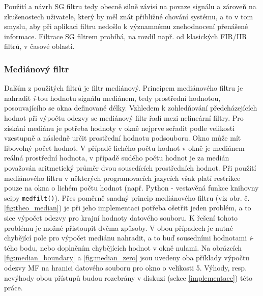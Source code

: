 \documentclass[a4paper, 12pt]{article}
\begin{document}
\noindent Použití a návrh SG filtru tedy obecně silně závisí na povaze signálu a zároveň na zkušenostech uživatele, který by měl znát přibližné chování systému, a to v tom smyslu, aby při aplikaci filtru nedošlo k významnému znehodnocení přenášené informace.
\vskip 0.1in
\noindent Filtrace SG filtrem probíhá, na rozdíl např. od klasických FIR/IIR filtrů, v časové oblasti.

\subsubsection{Mediánový filtr}
\label{sec:filtr3}
Dalším z použitých filtrů je filtr mediánový. Principem mediánového filtru je nahradit \textit{i}-tou hodnotu signálu mediánem, tedy prostřední hodnotou, posouvajícího se okna definované délky. Vzhledem k zohledňování předcházejících hodnot při výpočtu odezvy se mediánový filtr řadí mezi nelineární filtry. Pro získání mediánu je potřeba hodnoty v okně nejprve seřadit podle velikosti vzestupně a následně určit prostřední hodnotu podsouboru. Okno může mít libovolný počet hodnot. V případě lichého počtu hodnot v okně je mediánem reálná prostřední hodnota, v případě sudého počtu hodnot je za medián považován aritmetický průměr dvou sousedících prostředních hodnot. Při použití mediánového filtru v některých programovacích jazycích však platí restrikce pouze na okna o lichém počtu hodnot (např. Python - vestavěná funkce knihovny scipy \texttt{medfilt()}). Přes poměrně snadný princip mediánového filtru (viz obr. č. \ref{fig:theo_median}) je při jeho implementaci potřeba ošetřit jeden problém, a to sice výpočet odezvy pro krajní hodnoty datového souboru. K řešení tohoto problému je možné přistoupit dvěma způsoby. V obou případech je nutné chybějící pole pro výpočet mediánu nahradit, a to buď sousedními hodnotami \textit{i}-tého bodu, nebo doplněním chybějících hodnot v okně nulami. Na obrázcích \ref{fig:median_boundary} a \ref{fig:median_zero} jsou uvedeny oba příklady výpočtu odezvy MF na hranici datového souboru pro okno o velikosti 5. Výhody, resp. nevýhody obou přístupů budou rozebrány v diskuzi (sekce \ref{implementace}) této práce.\vspace{6cm}
\end{document}
